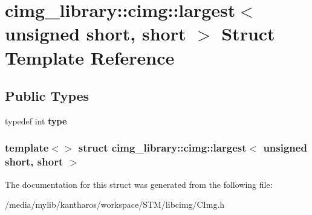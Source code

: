 \hypertarget{structcimg__library_1_1cimg_1_1largest_3_01unsigned_01short_00_01short_01_4}{
\section{cimg\_\-library::cimg::largest$<$ unsigned short, short $>$ Struct Template Reference}
\label{structcimg__library_1_1cimg_1_1largest_3_01unsigned_01short_00_01short_01_4}
}
\subsection*{Public Types}
\begin{DoxyCompactItemize}
\item 
\hypertarget{structcimg__library_1_1cimg_1_1largest_3_01unsigned_01short_00_01short_01_4_ab52a869a22c3a959116d9a3a0d52d23b}{
typedef int {\bfseries type}}
\label{structcimg__library_1_1cimg_1_1largest_3_01unsigned_01short_00_01short_01_4_ab52a869a22c3a959116d9a3a0d52d23b}

\end{DoxyCompactItemize}
\subsubsection*{template$<$$>$ struct cimg\_\-library::cimg::largest$<$ unsigned short, short $>$}



The documentation for this struct was generated from the following file:\begin{DoxyCompactItemize}
\item 
/media/mylib/kantharos/workspace/STM/libcimg/CImg.h\end{DoxyCompactItemize}
